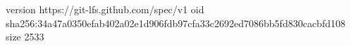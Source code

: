 version https://git-lfs.github.com/spec/v1
oid sha256:34a47a0350efab402a02e1d906fdb97cfa33c2692ed7086bb5fd830cacbfd108
size 2533
